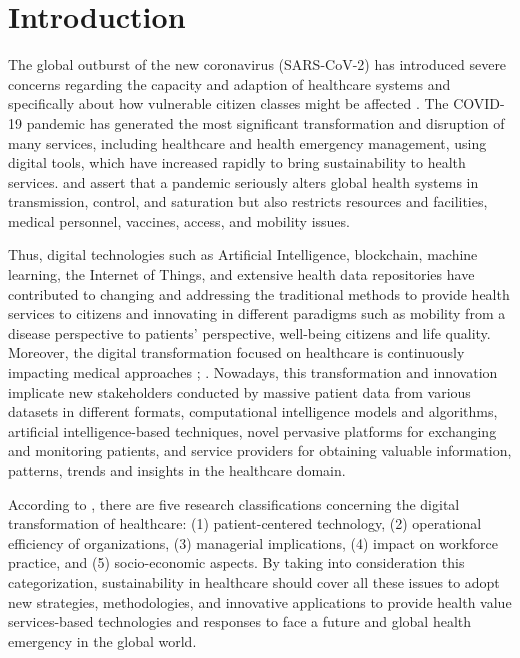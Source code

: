 \documentclass[sustainability,article,submit,pdftex,moreauthors]{Definitions/mdpi}
\begin{document}

\section{Introduction}

The global outburst of the new coronavirus (SARS-CoV-2) has introduced severe concerns regarding the capacity and adaption of healthcare systems and specifically about how vulnerable citizen classes might be affected \citep{lancet2020covid}. The COVID-19 pandemic has generated the most significant transformation and disruption of many services, including healthcare and health emergency management, using digital tools, which have increased rapidly to bring sustainability to health services. \citet{moazzami2020covid} and \citet{katz2020covid} assert that a pandemic seriously alters global health systems in transmission, control, and saturation but also restricts resources and facilities, medical personnel, vaccines, access, and mobility issues. 

Thus, digital technologies such as Artificial Intelligence, blockchain, machine learning, the Internet of Things, and extensive health data repositories have contributed to changing and addressing the traditional methods to provide health services to citizens and innovating in different paradigms such as mobility from a disease perspective to patients’ perspective, well-being citizens and life quality. Moreover, the digital transformation focused on healthcare is continuously impacting medical approaches \citep{sousa2019decision}; \citep{massaro2021digital}. Nowadays, this transformation and innovation implicate new stakeholders conducted by massive patient data from various datasets in different formats, computational intelligence models and algorithms, artificial intelligence-based techniques, novel pervasive platforms for exchanging and monitoring patients, and service providers for obtaining valuable information, patterns, trends and insights in the healthcare domain.

According to \citep{kraus2021digital}, there are five research classifications concerning the digital transformation of healthcare: (1) patient-centered technology, (2) operational efficiency of organizations, (3) managerial implications, (4) impact on workforce practice, and (5) socio-economic aspects. By taking into consideration this categorization, sustainability in healthcare should cover all these issues to adopt new strategies, methodologies, and innovative applications to provide health value services-based technologies and responses to face a future and global health emergency in the global world.
\end{document}
